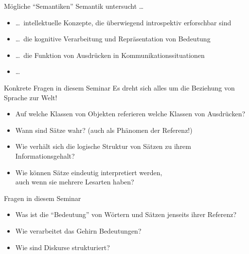 \begin{frame}
  {Mögliche "`Semantiken"'}
  \onslide<+->
  \onslide<+->
  Semantik untersucht \ldots\\
  \begin{itemize}[<+->]
    \item \ldots\ intellektuelle Konzepte, die überwiegend introspektiv erforschbar sind
    \item \ldots\ die kognitive Verarbeitung und Repräsentation von Bedeutung
    \item \ldots\ die Funktion von Ausdrücken in Kommunikationssituationen
    \item \ldots\ 
  \end{itemize}
\end{frame}

\begin{frame}
  {Konkrete Fragen in diesem Seminar}
  \onslide<+->
  \onslide<+->
  Es dreht sich alles um die Beziehung von Sprache zur Welt!\\
  \Zeile
  \begin{itemize}[<+->]
    \item Auf welche Klassen von Objekten \alert{referieren} welche Klassen von Ausdrücken?
    \item Wann sind Sätze wahr? (auch als Phänomen der \alert{Referenz}!)
    \item Wie verhält sich die logische Struktur von Sätzen zu ihrem Informationsgehalt?
    \item Wie können Sätze eindeutig interpretiert werden,\\
      auch wenn sie mehrere Lesarten haben?
  \end{itemize}
\end{frame}

\begin{frame}
  { Fragen in diesem Seminar}
  \onslide<+->
  \begin{itemize}[<+->]
    \item Was ist die "`Bedeutung"' von Wörtern und Sätzen jenseits ihrer Referenz?
    \item Wie verarbeitet das Gehirn Bedeutungen?
    \item Wie sind Diskurse strukturiert?
  \end{itemize}
\end{frame}

